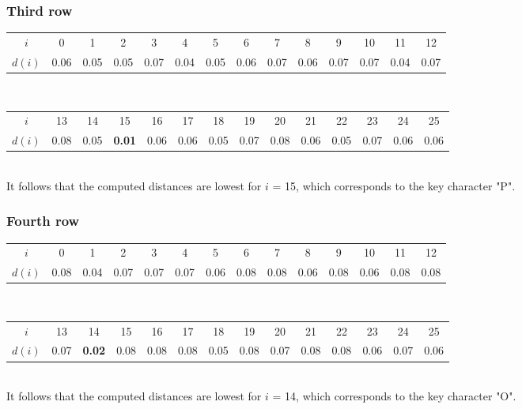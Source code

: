 \documentclass[11pt]{report}
\begin{document}
\subsubsection{Third row}
\begin{tabular}{| c | c c c c c c c c c c c c c |}
\hline
$i$ & 0 & 1 & 2 & 3 & 4 & 5 & 6 & 7 & 8 & 9 & 10 & 11 & 12\\
$d(i)$ & 0.06
& 0.05
& 0.05
& 0.07
& 0.04
& 0.05
& 0.06
& 0.07
& 0.06
& 0.07
& 0.07
& 0.04
& 0.07\\
\hline
\end{tabular}
\\[0.05cm]
\begin{tabular}{| c | c c c c c c c c c c c c c |}
\hline
$i$ & 13 & 14 & 15 & 16 & 17 & 18 & 19 & 20 & 21 & 22 & 23 & 24 & 25\\
$d(i)$ & 0.08
& 0.05
& \textbf{0.01}
& 0.06
& 0.06
& 0.05
& 0.07
& 0.08
& 0.06
& 0.05
& 0.07
& 0.06
& 0.06\\
\hline
\end{tabular}
${}$\\
It follows that the computed distances are lowest for $i$ = 15, which corresponds to the key
character "P".

\subsubsection{Fourth row}
\begin{tabular}{| c | c c c c c c c c c c c c c |}
\hline
$i$ & 0 & 1 & 2 & 3 & 4 & 5 & 6 & 7 & 8 & 9 & 10 & 11 & 12\\
$d(i)$ & 0.08
& 0.04
& 0.07
& 0.07
& 0.07
& 0.06
& 0.08
& 0.08
& 0.06
& 0.08
& 0.06
& 0.08
& 0.08 \\
\hline
\end{tabular}
\\[0.05cm]
\begin{tabular}{| c | c c c c c c c c c c c c c |}
\hline
$i$ & 13 & 14 & 15 & 16 & 17 & 18 & 19 & 20 & 21 & 22 & 23 & 24 & 25\\
$d(i)$ & 0.07
& \textbf{0.02}
& 0.08
& 0.08
& 0.08
& 0.05
& 0.08
& 0.07
& 0.08
& 0.08
& 0.06
& 0.07
& 0.06\\
\hline
\end{tabular}
${}$\\
It follows that the computed distances are lowest for $i$ = 14, which corresponds to the key
character "O".
\end{document}
